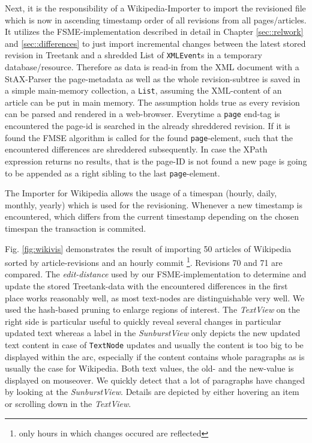 Next, it is the responsibility of a Wikipedia-Importer to import the revisioned file which is now in ascending timestamp order of all revisions from all pages/articles. It utilizes the FSME-implementation described in detail in Chapter \ref{sec::relwork} and \ref{sec::differences} to just import incremental changes between the latest stored revision in Treetank and a shredded List of \texttt{XMLEvent}s in a temporary database/resource. Therefore as data is read-in from the XML document with a StAX-Parser the page-metadata as well as the whole revision-subtree is saved in a simple main-memory collection, a \texttt{List}, assuming the XML-content of an article can be put in main memory. The assumption holds true as every revision can be parsed and rendered in a web-browser. Everytime a \texttt{page} end-tag is encountered the page-id is searched in the already shreddered revision. If it is found the FMSE algorithm is called for the found \texttt{page}-element, such that the encountered differences are shreddered subsequently. In case the XPath expression returns no results, that is the page-ID is not found a new page is going to be appended as a right sibling to the last \texttt{page}-element.

The Importer for Wikipedia allows the usage of a timespan (hourly, daily, monthly, yearly) which is used for the revisioning. Whenever a new timestamp is encountered, which differs from the current timestamp depending on the chosen timespan the transaction is commited.

Fig. \ref{fig:wikivis} demonstrates the result of importing 50 articles of Wikipedia sorted by article-revisions and an hourly commit \footnote{only hours in which changes occured are reflected}. Revisions 70 and 71 are compared. The \emph{edit-distance} used by our FSME-implementation to determine and update the stored Treetank-data with the encountered differences in the first place works reasonably well, as most text-nodes are distinguishable very well. We used the hash-based pruning to enlarge regions of interest. The \emph{TextView} on the right side is particular useful to quickly reveal several changes in particular updated text whereas a label in the \emph{SunburstView} only depicts the new updated text content in case of \texttt{TextNode} updates and usually the content is too big to be displayed within the arc, especially if the content contains whole paragraphs as is usually the case for Wikipedia. Both text values, the old- and the new-value is displayed on mouseover. We quickly detect that a lot of paragraphs have changed by looking at the \emph{SunburstView}. Details are depicted by either hovering an item or scrolling down in the \emph{TextView}. %

